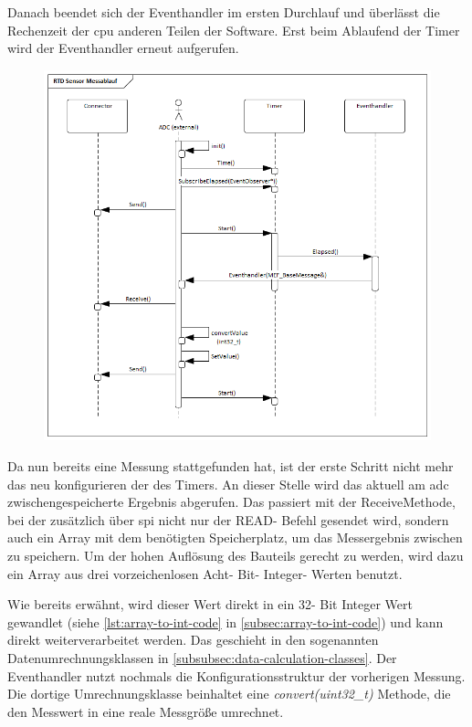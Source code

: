Danach beendet sich der Eventhandler im ersten Durchlauf und überlässt die Rechenzeit der \ac{cpu} anderen Teilen der Software.
Erst beim Ablaufend der Timer wird der Eventhandler erneut aufgerufen.

\begin{figure}[!htb]
    \begin{center}
        \includegraphics[width=1\textwidth]{Figures/Chapter_3/rtd-ablauf.png}
        
        \label{fig:rtd-ablauf}
    \end {center}
\end{figure}

Da nun bereits eine Messung stattgefunden hat, ist der erste Schritt nicht mehr das neu konfigurieren der des Timers.
An dieser Stelle wird das aktuell am \ac{adc} zwischengespeicherte Ergebnis abgerufen.
Das passiert mit der ReceiveMethode, bei der zusätzlich über \ac{spi} nicht nur der READ- Befehl gesendet wird, sondern auch ein Array mit dem benötigten Speicherplatz, um das Messergebnis zwischen zu speichern.
Um der hohen Auflösung des Bauteils gerecht zu werden, wird dazu ein Array aus drei vorzeichenlosen Acht- Bit- Integer- Werten benutzt.

Wie bereits erwähnt, wird dieser Wert direkt in ein 32- Bit Integer Wert gewandlet (siehe \autoref{lst:array-to-int-code} in \autoref{subsec:array-to-int-code}) und kann direkt weiterverarbeitet werden.
Das geschieht in den sogenannten Datenumrechnungsklassen in \autoref{subsubsec:data-calculation-classes}.
Der Eventhandler nutzt nochmals die Konfigurationsstruktur der vorherigen Messung. Die dortige Umrechnungsklasse beinhaltet eine \textit{convert(uint32\_t)} Methode, die den Messwert in eine reale Messgröße umrechnet.

